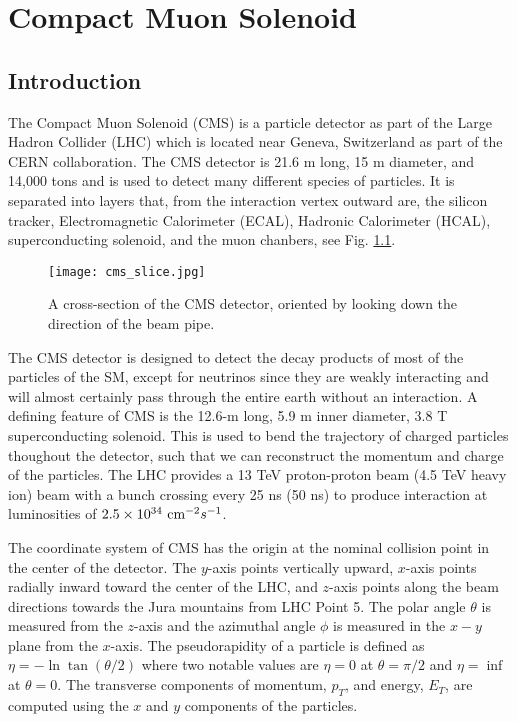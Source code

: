 \chapter{Compact Muon Solenoid}
\label{ch:CMS}

\section{Introduction}
\label{sec:cmsIntro}

The Compact Muon Solenoid (CMS) is a particle detector as part of the Large Hadron Collider (LHC) which is located near Geneva, Switzerland as part of the CERN collaboration. The CMS detector is 21.6 m long, 15 m diameter, and 14,000 tons and is used to detect many different species of particles. It is separated into layers that, from the interaction vertex outward are, the silicon tracker, Electromagnetic Calorimeter (ECAL), Hadronic Calorimeter (HCAL), superconducting solenoid, and the muon chanbers, see Fig. \ref{CMSSlice}. 

\begin{figure}
 	\centering
	\texttt{[image: cms\_slice.jpg]}
 	\caption{A cross-section of the CMS detector, oriented by looking down the direction of the beam pipe. }
 	\label{CMSSlice} 
\end{figure}

The CMS detector is designed to detect the decay products of most of the particles of the SM, except for neutrinos since they are weakly interacting and will almost certainly pass through the entire earth without an interaction. A defining feature of CMS is the 12.6-m long, 5.9 m inner diameter, 3.8 T superconducting solenoid. This is used to bend the trajectory of charged particles thoughout the detector, such that we can reconstruct the momentum and charge of the particles. The LHC provides a 13 TeV proton-proton beam (4.5 TeV heavy ion) beam with a bunch crossing every 25 ns (50 ns) to produce interaction at luminosities of $2.5\times10^{34} \text{ cm}^{-2}s^{-1}$. 

The coordinate system of CMS has the origin at the nominal collision point in the center of the detector. The $y$-axis points vertically upward, $x$-axis points radially inward toward the center of the LHC, and $z$-axis points along the beam directions towards the Jura mountains from LHC Point 5. The polar angle $\theta$ is measured from the $z$-axis and the azimuthal angle $\phi$ is measured in the $x-y$ plane from the $x$-axis. The pseudorapidity of a particle is defined as $\eta=-\ln\tan(\theta/2)$ where two notable values are $\eta=0$ at $\theta=\pi/2$ and $\eta=\inf$ at $\theta=0$. The transverse components of momentum, $p_T$, and energy, $E_T$, are computed using the $x$ and $y$ components of the particles. 

